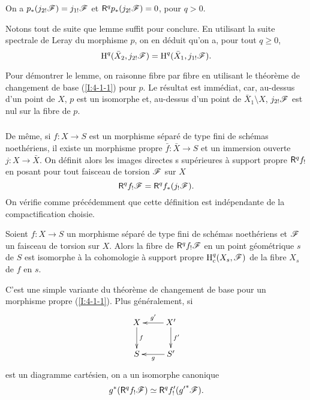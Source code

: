 \documentclass[oneside]{book}
\begin{document}
\begin{lemma}\label{I:4-5-2}
On a $p_*(j_{2!} \mathscr{F}) = j_{1!} \mathscr{F}$ et $\mathsf{R}^q p_*(j_{2!} \mathscr{F}) = 0$, pour $q>0$. 
\end{lemma}

Notons tout de suite que lemme suffit pour conclure. En utilisant la suite 
spectrale de Leray du morphisme $p$, on en déduit qu'on a, pour tout 
$q\geqslant 0$, 
\[
  \operatorname{H}^q(\bar X_2, j_{2!} \mathscr{F}) = \operatorname{H}^q(\bar X_1, j_{1!} \mathscr{F}) \text{.}
\]

Pour démontrer le lemme, on raisonne fibre par fibre en utilisant le théorème 
de changement de base (\ref{I:4-1-1}) pour $p$. Le résultat est immédiat, car, 
au-dessus d'un point de $X$, $p$ est un isomorphe et, au-dessus d'un point de 
$\bar X_1\setminus X$, $j_{2!} \mathscr{F}$ est nul sur la fibre de $p$. 





\subsubsection{}\label{I:4-5-3}

De même, si $f:X\to S$ est un morphisme séparé de type fini de schémas 
noethériens, il existe un morphisme propre $\bar f:\bar X\to S$ et un 
immersion ouverte $j:X\to \bar X$. On définit alors les images directes s
supérieures à support propre $\mathsf{R}^q f_!$ en posant pour tout faisceau de 
torsion $\mathscr{F}$ sur $X$
\[
  \mathsf{R}^q f_! \mathscr{F} = \mathsf{R}^q f_*(j_! \mathscr{F}) \text{.}
\]
On vérifie comme précédemment que cette définition est indépendante de 
la compactification choisie. 





\begin{theorem}\label{I:4-5-4}
Soient $f:X\to S$ un morphisme séparé de type fini de schémas noethériens 
et $\mathscr{F}$ un faisceau de torsion sur $X$. Alors la fibre de $\mathsf{R}^q f_! \mathscr{F}$ en un 
point géométrique $s$ de $S$ est isomorphe à la cohomologie à support 
propre $\operatorname{H}_c^q(X_s,\mathscr{F})$ de la fibre $X_s$ de $f$ en $s$. 
\end{theorem}

C'est une simple variante du théorème de changement de base pour un morphisme 
propre (\ref{I:4-1-1}). Plus généralement, si 
\[\xymatrix{
  X \ar[d]^-f
    & X' \ar[l]_-{g'} \ar[d]^-{f'} \\
  S 
    & S' \ar[l]^-g
}\]
est un diagramme cartésien, on a un isomorphe canonique 
\begin{equation}\label{I:eq:3}
  g^* (\mathsf{R}^q f_! \mathscr{F}) \simeq \mathsf{R}^q f_!'({g'}^* \mathscr{F}) \text{.}
\end{equation}
\end{document}
